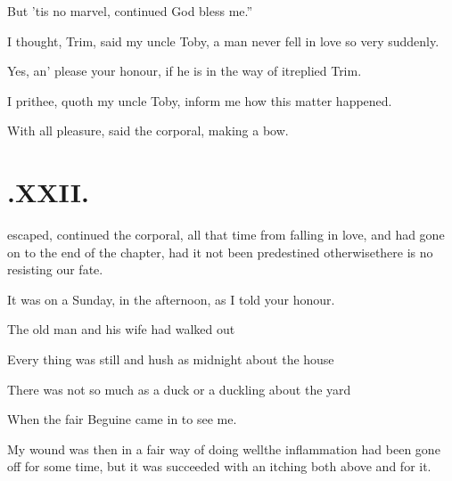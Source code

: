\documentclass[twoside]{article}
\begin{document}
\quad\tsh But ’tis no marvel, continued\break 
{}
\lqq God bless me.”

\vfill{}\eject

I thought, Trim, said my uncle\break
Toby, a man never fell in love so very\break
suddenly.

Yes, an’ please your honour, if\break
he is in the way of it\tsh replied\break
Trim.

I prithee, quoth my uncle Toby,\break
inform me how this matter happened.

\tsh With all pleasure, said the corporal, making a
bow.

\vfill{}\eject\null
\section{.\enspace XXII.}

 escaped, continued the
corporal, all that time from falling in love, and had gone on to
the end of the chapter, had it not been predestined
otherwise\tsh\break there is no resisting our fate.

It was on a Sunday, in the afternoon, as I told your
honour.

The old man and his wife had walked
out\tsh

Every thing was still and hush as midnight about the
house\tsh

There was not so much as a duck or a duckling about the
yard\tsh{}

\tsh When the fair Beguine came in to see
me.

My wound was then in a fair way of doing well\tsh the
inflammation had been gone off for some time, but it was succeeded
with an itching both above and 
for it.
\end{document}

